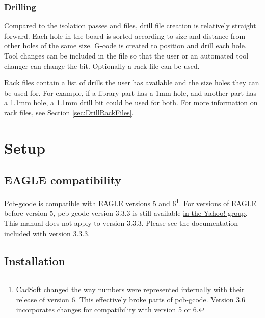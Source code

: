 \documentclass[11pt]{book}
\begin{document}
\subsection{Drilling}
Compared to the isolation passes and files, drill file creation is relatively straight forward. Each hole in the board is sorted according to size and distance from other holes of the same size. G-code is created to position and drill each hole. Tool changes can be included in the file so that the user or an automated tool changer can change the bit. Optionally a rack file can be used. 

Rack files contain a list of drills the user has available and the size holes they can be used for. For example, if a library part has a 1mm hole, and another part has a 1.1mm hole, a 1.1mm drill bit could be used for both. For more information on rack files, see Section \vref{sec:DrillRackFiles}. 

%
\chapter{Setup}\label{chp:Setup}
%

%
%
\section{EAGLE compatibility}\label{sec:EAGLECompatibility}

Pcb-gcode is compatible with EAGLE versions 5 and 6\footnote{CadSoft changed the way numbers were represented internally with their release of version 6. This effectively broke parts of pcb-gcode. Version 3.6 incorporates changes for compatibility with version 5 or 6.}. For versions of EAGLE before version 5, pcb-gcode version 3.3.3 is still available \href{http://groups.yahoo.com/group/pcb-gcode/files/\%21\%20Software/pcb-gcode-3.3.3.zip}{in the Yahoo! group}. This manual does not apply to version 3.3.3. Please see the documentation included with version 3.3.3.
%
%
\section{Installation}\label{sec:Installation}
\end{document}
